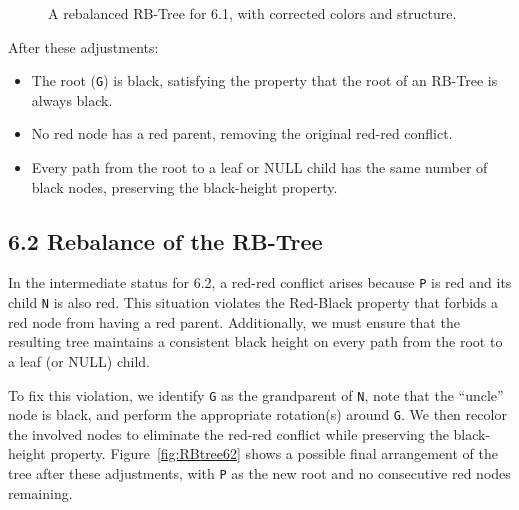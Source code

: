 \documentclass[11pt]{article}
\begin{document}
	\begin{figure}[h!]
		\centering
		\caption{A rebalanced RB-Tree for 6.1, with corrected colors and structure.}
		\label{fig:RBtree61}
	\end{figure}
	
	\noindent
	After these adjustments:
	\begin{itemize}
		\item The root (\texttt{G}) is black, satisfying the property that the root of an RB-Tree is always black.
		\item No red node has a red parent, removing the original red-red conflict.
		\item Every path from the root to a leaf or NULL child has the same number of black nodes, preserving the black-height property.
	\end{itemize}
	
	\newpage
	\subsection*{6.2 Rebalance of the RB-Tree}
	\label{sec:rbfix62}
	
	In the intermediate status for 6.2, a red-red conflict arises because \texttt{P} is red and its child \texttt{N} is also red. This situation violates the Red-Black property that forbids a red node from having a red parent. Additionally, we must ensure that the resulting tree maintains a consistent black height on every path from the root to a leaf (or NULL) child.
	
	To fix this violation, we identify \texttt{G} as the grandparent of \texttt{N}, note that the “uncle” node is black, and perform the appropriate rotation(s) around \texttt{G}. We then recolor the involved nodes to eliminate the red-red conflict while preserving the black-height property. Figure~\ref{fig:RBtree62} shows a possible final arrangement of the tree after these adjustments, with \texttt{P} as the new root and no consecutive red nodes remaining.
	
\end{document}
